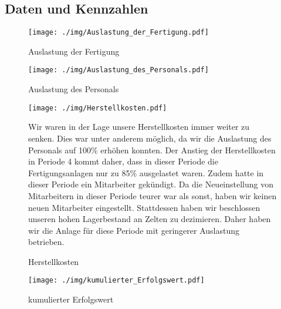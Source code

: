\documentclass[a4paper, 12pt]{report}
\begin{document}
\begin{flushleft}
\chapter{Daten und Kennzahlen}
 
 \begin{figure}[th]
 \centering 
 \texttt{[image: ./img/Auslastung\_der\_Fertigung.pdf]}
 \caption[Auslastung der Fertigung]{Auslastung der Fertigung}
  \texttt{[image: ./img/Auslastung\_des\_Personals.pdf]}
  \caption[Auslastung des Personals]{Auslastung des Personals}  
\end{figure}

 
 \begin{figure}[th]
 \centering 
 \texttt{[image: ./img/Herstellkosten.pdf]}
  \caption[Herstellkosten]{Herstellkosten}
\begin{flushleft}
Wir waren in der Lage unsere Herstellkosten immer weiter zu senken. Dies war unter anderem möglich, da wir die Auslastung des Personals auf 100\% erhöhen konnten. 
Der Anstieg der Herstellkosten in Periode 4 kommt daher, dass in dieser Periode die Fertigungsanlagen nur zu 85\% ausgelastet waren.
Zudem hatte in dieser Periode ein Mitarbeiter gekündigt.
Da die Neueinstellung von Mitarbeitern in dieser Periode teurer war als sonst, haben wir keinen neuen Mitarbeiter eingestellt.
Stattdessen haben wir beschlossen unseren hohen Lagerbestand an Zelten zu dezimieren.
Daher haben wir die Anlage für diese Periode mit geringerer Auslastung betrieben.
\end{flushleft}
\end{figure}




 \begin{figure}[b]
 \centering 
 \texttt{[image: ./img/kumulierter\_Erfolgswert.pdf]}
  \caption[kumulierter Erfolgswert]{kumulierter Erfolgswert}
\end{figure}
 

\end{flushleft}
\end{document}
